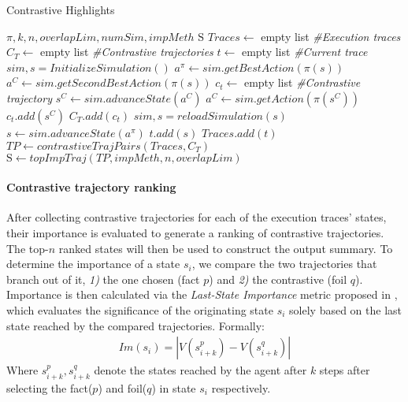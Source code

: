 \documentclass{ecai}
\begin{document}
\begin{algorithm}[tb]
    \caption{Contrastive Highlights}
    \label{alg:contrastive highlights}
\begin{algorithmic}[1]
     $\pi, k, n,overlapLim,numSim, impMeth$ 
     $\mathrm{S}$ 
    \STATE $Traces \leftarrow$ empty list \textit{\;\;\;\#Execution traces}
    \STATE $C_T \leftarrow$ empty list \textit{\;\;\;\#Contrastive trajectories}  
    \STATE $t \leftarrow$ empty list \textit{\;\;\;\#Current trace}
    \STATE $sim, s = InitializeSimulation()$
    \STATE $a^{\pi} \leftarrow sim.getBestAction(\pi(s))$ 
    \STATE $a^C \leftarrow sim.getSecondBestAction(\pi(s))$ 
    \STATE $c_t \leftarrow$ empty list \textit{\;\;\;\#Contrastive trajectory} 
    \STATE $s^C \leftarrow sim.advanceState(a^C)$ 
    \STATE $a^C \leftarrow sim.getAction(\pi(s^C))$ 
    \STATE $c_t.add(s^C)$ 
    \ENDFOR 
    \STATE $C_T.add(c_t)$ 
    \STATE $sim, s = reloadSimulation(s)$ 
    \STATE $s \leftarrow sim.advanceState(a^{\pi})$ 
    \STATE $t.add(s)$ 
    \ENDWHILE
    \STATE $Traces.add(t)$ 
    \ENDFOR 
    \STATE $TP \leftarrow contrastiveTrajPairs(Traces, C_T)$ 
    \STATE $\mathrm{S} \leftarrow topImpTraj(TP, impMeth, n
    , overlapLim)$
    \end{algorithmic}
\end{algorithm}

\paragraph{Contrastive trajectory ranking}
\label{sec:ch_importance}

After collecting contrastive trajectories for each of the execution traces' states, their importance is evaluated to generate a ranking of contrastive trajectories. The top-$n$ ranked states will then be used to construct the output summary. 
To determine the importance of a state $s_i$, we compare the two trajectories that branch out of it, \textit{1)} the one chosen (fact $p$) and \textit{2)} the contrastive (foil $q$). Importance is then calculated via the \emph{Last-State Importance} metric proposed in \cite{amitai2021don}, which evaluates the significance of the originating state $s_i$ solely based on the last state reached by the compared trajectories. 
Formally:
\begin{align}
    Im(s_i) = |V(s^{p}_{i+k}) - V(s^{q}_{i+k})|
\end{align}
Where $s^{p}_{i+k}, s^{q}_{i+k}$ denote the states reached by the agent after $k$ steps after selecting the fact($p$) and foil($q$) in state $s_i$ respectively.
\end{document}
